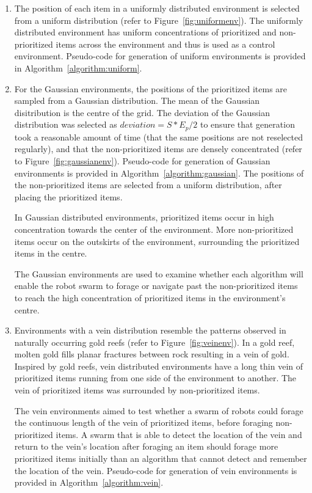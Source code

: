 \begin{enumerate}

\item The position of each item in a uniformly distributed environment is selected from a uniform distribution (refer to Figure~\ref{fig:uniformenv}). The uniformly distributed environment has uniform concentrations of prioritized and non-prioritized items across the environment and thus is used as a control environment. Pseudo-code for generation of uniform environments is provided in Algorithm~\ref{algorithm:uniform}.

\item For the Gaussian environments, the positions of the prioritized items are sampled from a Gaussian distribution. The mean of the Gaussian disitribution is the centre of the grid. The deviation of the Gaussian distribution was selected as $deviation = S*E_p/2$ to ensure that generation took a reasonable amount of time (that the same positions are not reselected regularly), and that the non-prioritized items are densely concentrated  (refer to Figure~\ref{fig:gaussianenv}). Pseudo-code for generation of Gaussian environments is provided in Algorithm~\ref{algorithm:gaussian}. The positions of the non-prioritized items are selected from a uniform distribution, after placing the prioritized items. 

In Gaussian distributed environments, prioritized items  occur in high concentration towards the center of the environment. More non-prioritized items occur on the outskirts of the environment, surrounding the prioritized items in the centre.

The Gaussian environments are used to examine whether each algorithm will enable the robot swarm to forage or navigate past the non-prioritized items to reach the high concentration of prioritized items in the environment's centre. 


\item Environments with a vein distribution resemble the patterns observed in naturally occurring gold reefs \cite{frimmel2002recent} (refer to Figure~\ref{fig:veinenv}). In a gold reef, molten gold fills planar fractures between rock resulting in a vein of gold. Inspired by gold reefs, vein distributed environments have a long thin vein of prioritized items running from one side of the environment to another. The vein of prioritized items was surrounded by non-prioritized items. 

The vein environments aimed to test whether a swarm of robots could forage the continuous length of the vein of prioritized items, before foraging non-prioritized items. A swarm that is able to detect the location of the vein and return to the vein's location after foraging an item should forage more prioritized items initially than an algorithm that cannot detect and remember the location of the vein.  Pseudo-code for generation of vein environments is provided in Algorithm~\ref{algorithm:vein}.



\end{enumerate}
